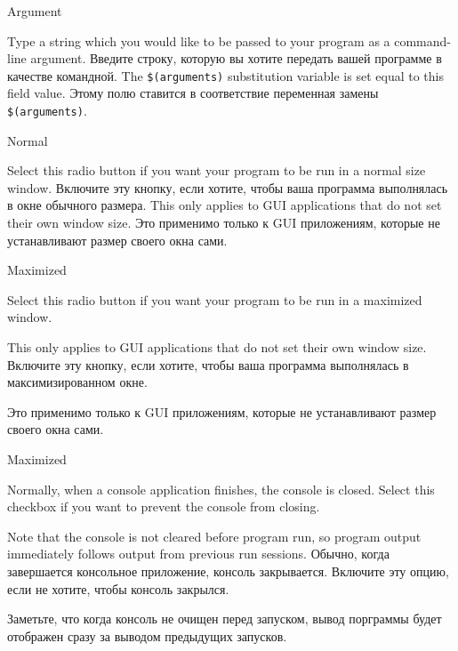 \begin{popup}
\caption{Argument}

\ifenglish
Type a string which you would like to be passed to your program
as a command-line argument.
 \else
Введите строку, которую вы хотите передать вашей программе в качестве
командной.
\fi
\ifenglish
The \verb'$(arguments)' substitution variable is set equal to this field value.
 \else
Этому полю ставится в соответствие переменная замены \verb'$(arguments)'.
 \fi
\end{popup}


\begin{popup}
\caption{Normal}

\ifenglish
Select this radio button if you
want your program to be run in a normal size window.
 \else
Включите эту кнопку, если хотите, чтобы ваша программа выполнялась в окне 
обычного размера.
\fi
\ifenglish
This only applies to GUI applications that do not set their own window size.
 \else
Это применимо только к GUI приложениям, которые не устанавливают размер своего 
окна сами.
\fi
\end{popup}

\begin{popup}
\caption{Maximized}

\ifenglish
Select this radio button if you
want your program to be run in a maximized window.

This only applies to GUI applications that do not set their own window size.
 \else
Включите эту кнопку, если хотите, чтобы ваша программа выполнялась в 
максимизированном окне.

Это применимо только к GUI приложениям, которые не устанавливают размер своего 
окна сами.
\fi
\end{popup}

\begin{popup}
\caption{Maximized}

\ifenglish
Normally, when a console application finishes, the console is closed.
Select this checkbox if you want to prevent the console
from closing.

Note that the console is not cleared before program run, so program output
immediately follows output from previous run sessions.
 \else
Обычно, когда завершается консольное приложение, консоль закрывается.
Включите эту опцию, если не хотите, чтобы консоль закрылся.

Заметьте, что когда консоль не очищен перед запуском, вывод порграммы
будет отображен сразу за выводом предыдущих запусков.
\fi
\end{popup}

